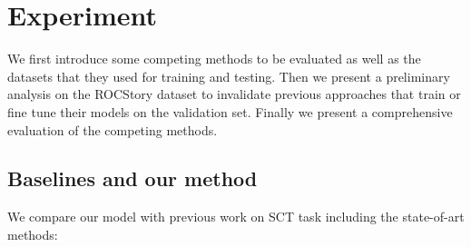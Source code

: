 \section{Experiment}
\label{sec:experiment}
We first introduce some competing methods to be evaluated as well as
the datasets that they used for training and testing.
Then we present a preliminary analysis on the ROCStory dataset to invalidate
previous approaches that train or fine tune their models on the validation
set. Finally we present a comprehensive
evaluation of the competing methods.

\subsection{Baselines and our method}
\label{sec:baselines}
We compare our model with previous work on SCT task including the 
state-of-art methods: 

